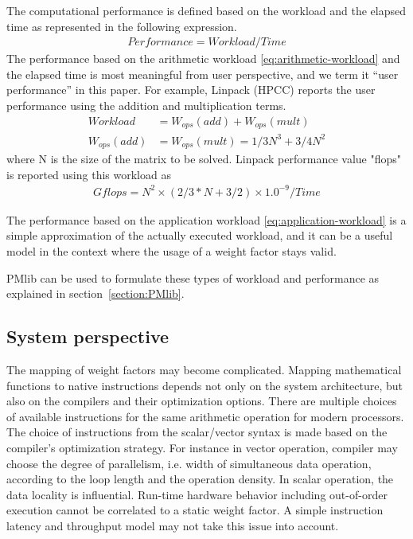 \documentclass[conference]{IEEEtran}
\begin{document}
The computational performance is defined based on the workload and
the elapsed time as represented in the following expression.
\begin{align}\label{eq:performance-workload-time}
Performance = Workload / Time 
\end{align}
%
The performance based on the arithmetic workload \eqref{eq:arithmetic-workload}
and the elapsed time is most meaningful from user perspective,
and we term it ``user performance'' in this paper.
%
For example, Linpack (HPCC)%
reports the user performance using the addition and multiplication terms.
\begin{align}
		Workload & = W_{ops}(add) + W_{ops}(mult) \\
		W_{ops}(add) & = W_{ops}(mult) = 1/3 N^{3} + 3/4 N^{2}
\end{align}
where N is the size of the matrix to be solved.
Linpack performance value "flops" is reported using this workload as
\begin{align}
Gflops = N^{2} \times ( 2/3 * N + 3/2 ) \times 1.0^{-9} / Time 
\end{align}

The performance based on the application workload
\eqref{eq:application-workload}
is a simple approximation of the actually executed workload,
and it can be a useful model in the context where the usage of
a weight factor stays valid.

PMlib can be used to formulate these types of
workload and performance
as explained in section~\ref{section:PMlib}.



\subsection{System perspective}
\label{subsection:system-perspective}
%
%
The mapping of weight factors may become complicated.
Mapping mathematical functions to native instructions
depends not only on the system architecture, but also on the compilers
and their optimization options.
There are multiple choices of available instructions for the same
arithmetic operation for modern processors.
The choice of instructions from the scalar/vector syntax is made based on the
compiler's optimization strategy.
For instance in vector operation, compiler may choose
the degree of parallelism, i.e. width of simultaneous data operation,
according to the loop length and the operation density.
In scalar operation, the data locality is influential.
Run-time hardware behavior including out-of-order execution cannot
be correlated to a static weight factor.
A simple instruction latency and throughput model may not take this issue
into account.
\end{document}
